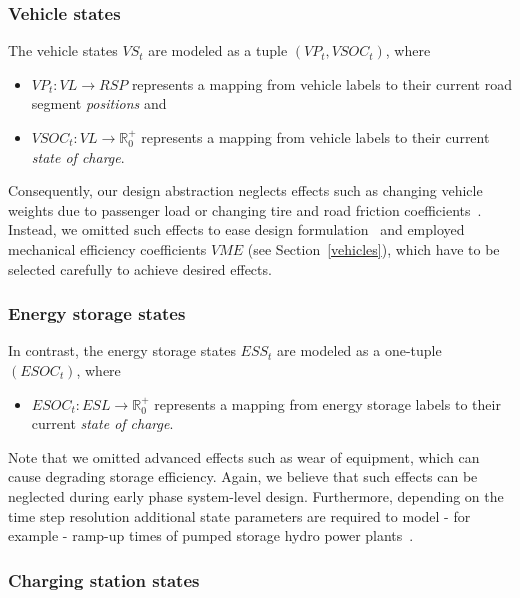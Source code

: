 \subsubsection{Vehicle states}
\label{states_vehicles}

The vehicle states $VS_t$ are modeled as a tuple $(VP_t, VSOC_t)$, where
\begin{itemize}
	\item $VP_t: VL \rightarrow RSP$ represents a mapping from vehicle labels to their current road segment \textit{positions} and
	\item $VSOC_t: VL \rightarrow \mathbb{R}_0^+$ represents a mapping from vehicle labels to their current \textit{state of charge}.
\end{itemize}
Consequently, our design abstraction neglects effects such as changing vehicle weights due to passenger load or changing tire and road friction coefficients~\cite{imine2006road}.
Instead, we omitted such effects to ease design formulation~\cite{gao2007modeling} and employed mechanical efficiency coefficients $VME$ (see Section~\ref{vehicles}), which have to be selected carefully to achieve desired effects.

\subsubsection{Energy storage states}
\label{states_storages}

In contrast, the energy storage states $ESS_t$ are modeled as a one-tuple $(ESOC_t)$, where
\begin{itemize}
	\item $ESOC_t: ESL \rightarrow \mathbb{R}_0^+$ represents a mapping from energy storage labels to their current \textit{state of charge}. 
\end{itemize}
Note that we omitted advanced effects such as wear of equipment, 
which can cause degrading storage efficiency. Again, we believe that such effects can be neglected during early phase system-level design. Furthermore, depending on the time step resolution additional state parameters are required to model - for example - ramp-up times of pumped storage hydro power plants~\cite{Garcia2008}.

\subsubsection{Charging station states}
\label{states_stations}

